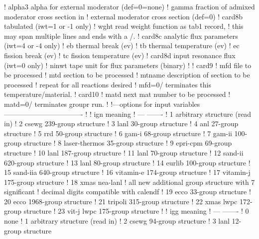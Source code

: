 \begin{ccode}
   !    alpha3   alpha for external moderator (def=0=none)
   !    gamma    fraction of admixed moderator cross section in
   !              external moderator cross section (def=0)
   ! card8b     tabulated (iwt=1 or -1 only)
   !    wght    read weight function as tab1 record,
   !            this may span multiple lines and ends with a /.
   ! card8c     analytic flux parameters (iwt=4 or -4 only)
   !    eb      thermal break (ev)
   !    tb      thermal temperature (ev)
   !    ec      fission break (ev)
   !    tc      fission temperature (ev)
   ! card8d     input resonance flux (iwt=0 only)
   !    ninwt   tape unit for flux parameters (binary)
   !
   ! card9
   !    mfd     file to be processed
   !    mtd     section to be processed
   !    mtname  description of section to be processed
   !          repeat for all reactions desired
   !          mfd=0/ terminates this temperature/material.
   ! card10
   !    matd    next mat number to be processed
   !            matd=0/ terminates groupr run.
   !
   !---options for input variables----------------------------------
   !
   !     ign          meaning
   !     ---          -------
   !      1           arbitrary structure (read in)
   !      2           csewg 239-group structure
   !      3           lanl 30-group structure
   !      4           anl 27-group structure
   !      5           rrd 50-group structure
   !      6           gam-i 68-group structure
   !      7           gam-ii 100-group structure
   !      8           laser-thermos 35-group structure
   !      9           epri-cpm 69-group structure
   !     10           lanl 187-group structure
   !     11           lanl 70-group structure
   !     12           sand-ii 620-group structure
   !     13           lanl 80-group structure
   !     14           eurlib 100-group structure
   !     15           sand-iia 640-group structure
   !     16           vitamin-e 174-group structure
   !     17           vitamin-j 175-group structure
   !     18           xmas nea-lanl
   !     all new additional group structure with 7 significant
   !     decimal digits compatible with calendf
   !     19           ecco  33-group structure
   !     20           ecco 1968-group structure
   !     21           tripoli 315-group structure
   !     22           xmas lwpc 172-group structure
   !     23           vit-j lwpc 175-group structure
   !
   !     igg          meaning
   !     ---          -------
   !      0           none
   !      1           arbitrary structure (read in)
   !      2           csewg 94-group structure
   !      3           lanl 12-group structure

\end{ccode}
